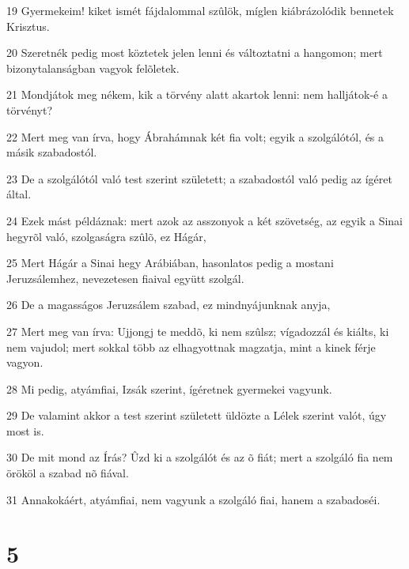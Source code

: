 \par 19 Gyermekeim! kiket ismét fájdalommal szûlök, míglen kiábrázolódik bennetek Krisztus.
\par 20 Szeretnék pedig most köztetek jelen lenni és változtatni a hangomon; mert bizonytalanságban vagyok felõletek.
\par 21 Mondjátok meg nékem, kik a törvény alatt akartok lenni: nem halljátok-é a törvényt?
\par 22 Mert meg van írva, hogy Ábrahámnak két fia volt; egyik a szolgálótól, és a másik  szabadostól.
\par 23 De a szolgálótól való test szerint született; a szabadostól való pedig az ígéret által.
\par 24 Ezek mást példáznak: mert azok az asszonyok a két szövetség, az egyik a Sinai hegyrõl való, szolgaságra szûlõ, ez Hágár,
\par 25 Mert Hágár a Sinai hegy Arábiában, hasonlatos pedig a mostani Jeruzsálemhez, nevezetesen fiaival együtt szolgál.
\par 26 De a magasságos Jeruzsálem szabad, ez mindnyájunknak anyja,
\par 27 Mert meg van írva: Ujjongj te meddõ, ki nem szûlsz; vígadozzál és kiálts, ki nem vajudol; mert sokkal több az elhagyottnak magzatja, mint a kinek férje vagyon.
\par 28 Mi pedig, atyámfiai, Izsák szerint, ígéretnek gyermekei vagyunk.
\par 29 De valamint akkor a test szerint született üldözte a Lélek szerint valót, úgy most is.
\par 30 De mit mond az Írás? Ûzd ki a szolgálót és az õ fiát; mert a szolgáló fia nem örököl a szabad nõ fiával.
\par 31 Annakokáért, atyámfiai, nem vagyunk a szolgáló fiai, hanem a szabadoséi.

\chapter{5}

